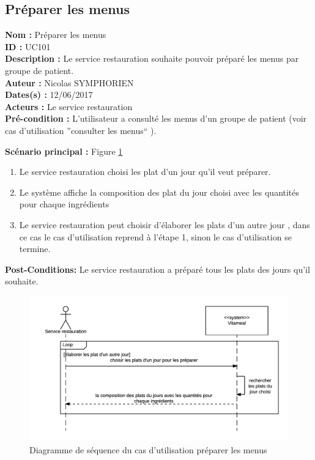 \subsection{Préparer les menus}

\noindent\textbf{Nom :} Préparer les menus \\
\textbf{ID :} UC101 \\
\textbf{Description :} Le service restauration souhaite pouvoir préparé les menus par groupe de patient. \\
\textbf{Auteur :} Nicolas SYMPHORIEN \\
\textbf{Dates(s) :} 12/06/2017 \\
\textbf{Acteurs :} Le service restauration \\
\textbf{Pré-condition :} L'utilisateur a consulté les menus d'un groupe de patient (voir cas d'utilisation ''consulter les menus`` ).

\noindent \textbf{Scénario principal : } Figure \ref{PreparerMenuSeq}

\begin{enumerate}
	\item Le service restauration choisi les plat d'un jour qu'il veut préparer.
	\item Le système affiche la composition des plat du jour choisi avec les quantités pour chaque ingrédients
	\item Le service restauration peut choisir d'élaborer les plats d'un autre jour , dans ce cas le cas d'utilisation reprend à l'étape 1, sinon le cas d'utilisation se termine.
\end{enumerate}

\noindent \textbf{Post-Conditions:} Le service restauration a préparé tous les plats des jours qu'il souhaite.

\begin{figure}
\centering
\includegraphics{../../CasDUtilisations/PreparerMenus/sequence_preparer_menus.png}
\caption{Diagramme de séquence du cas d'utilisation préparer les menus}
\label{PreparerMenuSeq}
\end{figure}